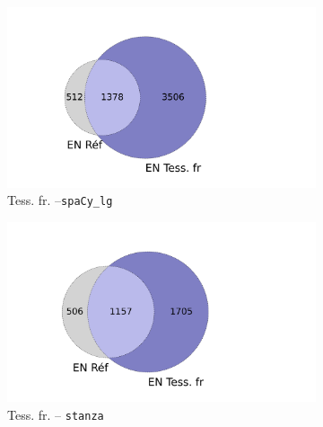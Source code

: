 \begin{figure}[h!]
    \begin{minipage}{7cm}
  \begin{subfigure}{1\textwidth}
  \includegraphics[width=1\textwidth]{IMAGES/INTERSECTIONS_GLOBALES/ELTeCFRA_Tess. fr_spacy-lg-concat_intersection.png} 
  \caption{Tess. fr. --\texttt{spaCy\_lg}}
  \label{fig:ELTeCFRA_Tess. fr_spacy-lg-concat_intersection}
  \end{subfigure}
  \end{minipage}
  \begin{minipage}{7cm}
  \begin{subfigure}{1\textwidth}
  \includegraphics[width=1\textwidth]{IMAGES/INTERSECTIONS_GLOBALES/ELTeCFRA_Tess. fr_stanza-concat_intersection.png}
  \caption{Tess. fr. -- \texttt{stanza}}
  \end{subfigure}
    \end{minipage}
\begin{minipage}{7cm}
  \begin{subfigure}{1\textwidth}

\end{subfigure}
\end{minipage}
\end{figure}
